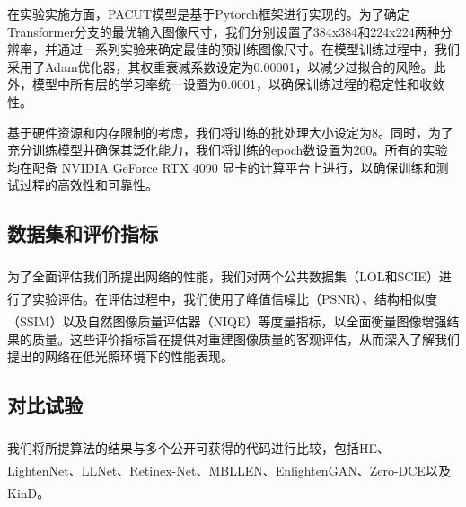 \documentclass[a4paper]{ctexart}
\newcommand{\upcite}[1]{\rmfamily\textsuperscript{\textsuperscript{\cite{#1}}}}
\begin{document}
在实验实施方面，PACUT模型是基于Pytorch框架进行实现的。为了确定Transformer分支的最优输入图像尺寸，我们分别设置了384x384和224x224两种分辨率，并通过一系列实验来确定最佳的预训练图像尺寸。在模型训练过程中，我们采用了Adam优化器，其权重衰减系数设定为0.00001，以减少过拟合的风险。此外，模型中所有层的学习率统一设置为0.0001，以确保训练过程的稳定性和收敛性。

基于硬件资源和内存限制的考虑，我们将训练的批处理大小设定为8。同时，为了充分训练模型并确保其泛化能力，我们将训练的epoch数设置为200。所有的实验均在配备 NVIDIA GeForce RTX 4090 显卡的计算平台上进行，以确保训练和测试过程的高效性和可靠性。

\subsection{数据集和评价指标}

为了全面评估我们所提出网络的性能，我们对两个公共数据集（LOL\upcite{wei2018deep}和SCIE\upcite{cai2018learning}）进行了实验评估。在评估过程中，我们使用了峰值信噪比（PSNR）\upcite{wang2004image}、结构相似度（SSIM）\upcite{wang2004image}以及自然图像质量评估器（NIQE）\upcite{mittal2012making}等度量指标，以全面衡量图像增强结果的质量。这些评价指标旨在提供对重建图像质量的客观评估，从而深入了解我们提出的网络在低光照环境下的性能表现。

\subsection{对比试验}

我们将所提算法的结果与多个公开可获得的代码进行比较，包括HE\upcite{pisano1998contrast}、LightenNet\upcite{li2018lightennet}、LLNet\upcite{lore2017llnet}、Retinex-Net\upcite{wei2018deep}、MBLLEN\upcite{lv2018mbllen}、EnlightenGAN\upcite{jiang2021enlightengan}、Zero-DCE\upcite{guo2020zero}以及KinD\upcite{zhang2019kindling}。
\end{document}
